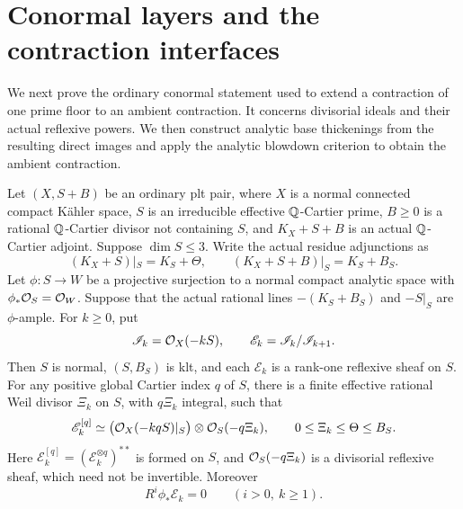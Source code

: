 \section{Conormal layers and the contraction interfaces}\label{sec:contraction-inputs}

We next prove the ordinary conormal statement used to extend a contraction
of one prime floor to an ambient contraction.  It concerns divisorial
ideals and their actual reflexive powers.  We then construct analytic
base thickenings from the resulting direct images and apply the analytic
blowdown criterion to obtain the ambient contraction.

\begin{proposition}\label{prop:conormal-layers}
Let \((X,S+B)\) be an ordinary plt pair, where \(X\) is a normal connected
compact K\"ahler space, \(S\) is an irreducible effective \(\mathbb Q\)-Cartier
prime, \(B\geq0\) is a rational \(\mathbb Q\)-Cartier divisor not containing
\(S\), and \(K_X+S+B\) is an actual \(\mathbb Q\)-Cartier adjoint.  Suppose
\(\dim S\leq3\).  Write the actual residue adjunctions as
\[
 (K_X+S)|_S=K_S+\Theta,\qquad
 (K_X+S+B)|_S=K_S+B_S .
\]
Let \(\phi:S\to W\) be a projective surjection to a normal compact
analytic space with \(\phi_*\mathcal O_S=\mathcal O_W\).  Suppose that the actual
rational lines \(-(K_S+B_S)\) and \(-S|_S\) are \(\phi\)-ample.
For \(k\geq0\), put
\[
 \mathscr I_k=\mathcal O_X(-kS),\qquad
 \mathscr E_k=\mathscr I_k/\mathscr I_{k+1}.
\]
Then \(S\) is normal, \((S,B_S)\) is klt, and each \(\mathscr E_k\)
is a rank-one reflexive sheaf on \(S\).  For any positive global Cartier
index \(q\) of \(S\), there is a finite effective rational Weil divisor
\(\Xi_k\) on \(S\), with \(q\Xi_k\) integral, such that
\begin{equation}\label{eq:conormal-actual-identity}
 \mathscr E_k^{[q]}
 \simeq \bigl(\mathcal O_X(-kqS)|_S\bigr)\otimes\mathcal O_S(-q\Xi_k),
 \qquad 0\leq\Xi_k\leq\Theta\leq B_S .
\end{equation}
Here \(\mathscr E_k^{[q]}=(\mathscr E_k^{\otimes q})^{**}\) is formed
on \(S\), and \(\mathcal O_S(-q\Xi_k)\) is a divisorial reflexive sheaf,
which need not be invertible.  Moreover
\begin{equation}\label{eq:conormal-vanishing}
 R^i\phi_*\mathscr E_k=0\qquad(i>0,\ k\geq1).
\end{equation}
\end{proposition}
